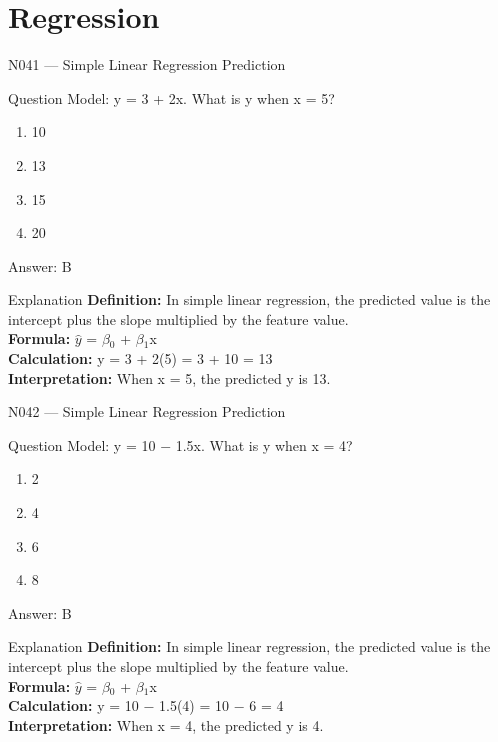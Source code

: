 \documentclass[aspectratio=169,8pt]{beamer}
\begin{document}
	\section{Regression}
	
	\begin{frame}{N041 --- Simple Linear Regression Prediction}
		\begin{block}{Question}
			Model: y = 3 + 2x. What is y when x = 5?
			\begin{enumerate}
				\item 10
				\item 13
				\item 15
				\item 20
			\end{enumerate}
		\end{block}
		\begin{exampleblock}{Answer: B}\end{exampleblock}
		\begin{block}{Explanation}
			\textbf{Definition:} In simple linear regression, the predicted value is the intercept plus the slope multiplied by the feature value.\\
			\textbf{Formula:} $\hat{y}$ = $\beta$$_{0}$ + $\beta$$_{1}$x\\
			\textbf{Calculation:} y = 3 + 2(5) = 3 + 10 = 13\\
			\textbf{Interpretation:} When x = 5, the predicted y is 13.
		\end{block}
	\end{frame}
	
	\begin{frame}{N042 --- Simple Linear Regression Prediction}
		\begin{block}{Question}
			Model: y = 10 $-$ 1.5x. What is y when x = 4?
			\begin{enumerate}
				\item 2
				\item 4
				\item 6
				\item 8
			\end{enumerate}
		\end{block}
		\begin{exampleblock}{Answer: B}\end{exampleblock}
		\begin{block}{Explanation}
			\textbf{Definition:} In simple linear regression, the predicted value is the intercept plus the slope multiplied by the feature value.\\
			\textbf{Formula:} $\hat{y}$ = $\beta$$_{0}$ + $\beta$$_{1}$x\\
			\textbf{Calculation:} y = 10 $-$ 1.5(4) = 10 $-$ 6 = 4\\
			\textbf{Interpretation:} When x = 4, the predicted y is 4.
		\end{block}
	\end{frame}
	
\end{document}
